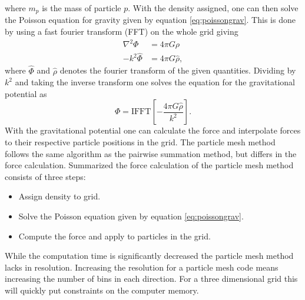 where $m_p$ is the mass of particle $p$.
With the density assigned, one can then solve the Poisson equation for gravity given
by equation \ref{eq:poissongrav}. This is done by using a fast fourier transform
(FFT) on the whole grid giving
\begin{align}
    \nabla^2\Phi&=4\pi G\rho\\
    -k^2 \hat{\Phi}&=4\pi G \hat{\rho},
\end{align}
where $\hat{\Phi}$ and $\hat{\rho}$ denotes the fourier transform of the given
quantities. Dividing by $k^2$ and taking the inverse transform one solves the
equation for the gravitational potential as
\begin{equation}
    \Phi = \mathrm{IFFT}[-\frac{4\pi G \hat{\rho}}{k^2}].
\end{equation}
With the gravitational potential one can calculate the force and interpolate
forces to their respective particle positions in the grid. The particle mesh
method follows the same algorithm as the pairwise summation method, but differs
in the force calculation. Summarized the force calculation of the particle mesh
method consists of three steps:
\begin{itemize}
    \item Assign density to grid. \\
    \item Solve the Poisson equation given by equation \ref{eq:poissongrav}.\\
    \item Compute the force and apply to particles in the grid.
\end{itemize}
While the computation time is significantly decreased the
particle mesh method lacks in resolution. Increasing the resolution for a
particle mesh code means increasing the number of bins in each direction. For a
three dimensional grid this will quickly put constraints on the computer memory.
